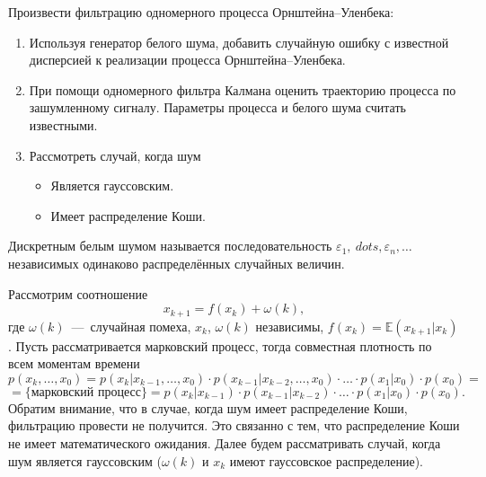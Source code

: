 
Произвести фильтрацию одномерного процесса Орнштейна--Уленбека:
\begin{enumerate}
	\item Используя генератор белого шума, добавить случайную ошибку с 
     известной дисперсией к реализации процесса Орнштейна--Уленбека.
	
	\item При помощи одномерного фильтра Калмана оценить траекторию 
     процесса по зашумленному сигналу. Параметры процесса и белого шума 
     считать известными.
	
	\item Рассмотреть случай, когда шум
	
	\begin{itemize}
		\item Является гауссовским.
		
		\item Имеет распределение Коши.
		
	\end{itemize}
	
\end{enumerate}



\begin{definition}
	Дискретным белым шумом называется последовательность \( \varepsilon_1, 
     \ dots, \varepsilon_n, \dots \) независимых одинаково распределённых 
     случайных величин.
\end{definition}

Рассмотрим соотношение 
\[
x_{k+1}=f(x_k)+\omega(k),
\]
где \( \omega(k) \)~---~случайная помеха, \( x_k \), \( \omega(k) \) 
 независимы, \( f(x_k)=\mathbb{E}(x_{k+1}|x_k) \). Пусть рассматривается 
 марковский процесс, тогда совместная плотность по всем моментам времени
\[
p(x_k,\ldots,x_0)=p(x_k|x_{k-1},\ldots,x_0)\cdot p(x_{k-1}|x_{k-2}, \dots, 
 x_0) \cdot \ldots \cdot p(x_1|x_0) \cdot p(x_0)=
\]
\[
=\lbrace\text{марковский процесс}\rbrace=p(x_k|x_{k-1})\cdot p(x_{k-1} 
| x_{k-2}) \cdot \ldots \cdot p(x_1|x_0)\cdot p(x_0).
\]
Обратим внимание, что в случае, когда шум имеет распределение Коши, 
 фильтрацию провести не получится. Это связанно с тем, что распределение 
 Коши не имеет математического ожидания.  Далее будем рассматривать случай, 
 когда шум является гауссовским (\( \omega(k) \) и \( x_k \) имеют 
 гауссовское распределение).


